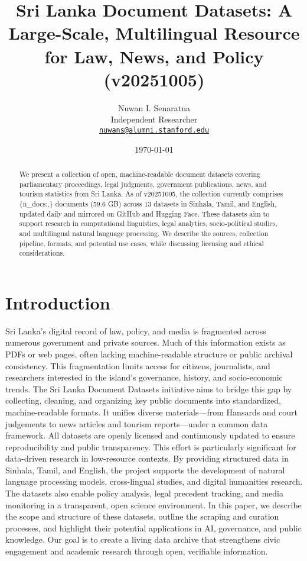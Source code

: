\documentclass[10pt,a4paper]{article}%
\title{Sri Lanka Document Datasets: A Large{-}Scale, Multilingual Resource for Law, News, and Policy (v20251005)}%
\author{Nuwan I. Senaratna\\Independent Researcher\\\vspace{0.25em}\texttt{\href{mailto:nuwans@alumni.stanford.edu}{nuwans@alumni.stanford.edu}}}%
\date{\today}%
\begin{document}
%
\normalsize%
\maketitle%
\begin{abstract}%
We present a collection of open, machine{-}readable document datasets covering parliamentary proceedings, legal judgments, government publications, news, and tourism statistics from Sri Lanka.  As of v20251005, the collection currently comprises \{n\_docs:,\} documents (59.6 GB) across 13 datasets in Sinhala, Tamil, and English, updated daily and mirrored on GitHub and Hugging Face.  These datasets aim to support research in computational linguistics, legal analytics, socio{-}political studies, and multilingual natural language processing.  We describe the sources, collection pipeline, formats, and potential use cases, while discussing licensing and ethical considerations.%
\newline%
\newline%
\end{abstract}%
\section{Introduction}%
\label{sec:Introduction}%
Sri Lanka’s digital record of law, policy, and media is fragmented across numerous government and private sources. Much of this information exists as PDFs or web pages, often lacking machine{-}readable structure or public archival consistency. This fragmentation limits access for citizens, journalists, and researchers interested in the island’s governance, history, and socio{-}economic trends.%
\newline%
\newline%
The Sri Lanka Document Datasets initiative aims to bridge this gap by collecting, cleaning, and organizing key public documents into standardized, machine{-}readable formats. It unifies diverse materials—from Hansards and court judgements to news articles and tourism reports—under a common data framework. All datasets are openly licensed and continuously updated to ensure reproducibility and public transparency.%
\newline%
\newline%
This effort is particularly significant for data{-}driven research in low{-}resource contexts. By providing structured data in Sinhala, Tamil, and English, the project supports the development of natural language processing models, cross{-}lingual studies, and digital humanities research. The datasets also enable policy analysis, legal precedent tracking, and media monitoring in a transparent, open science environment.%
\newline%
\newline%
In this paper, we describe the scope and structure of these datasets, outline the scraping and curation processes, and highlight their potential applications in AI, governance, and public knowledge. Our goal is to create a living data archive that strengthens civic engagement and academic research through open, verifiable information.%
\newline%
\newline
\end{document}
